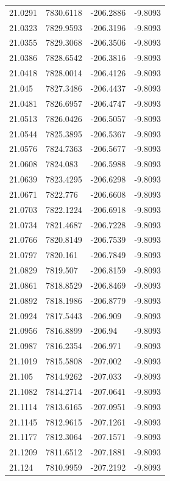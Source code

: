 \begin{table}[H]
\begin{tabular}{llll}
21.0291 & 7830.6118 & -206.2886 & -9.8093 \\
21.0323 & 7829.9593 & -206.3196 & -9.8093 \\
21.0355 & 7829.3068 & -206.3506 & -9.8093 \\
21.0386 & 7828.6542 & -206.3816 & -9.8093 \\
21.0418 & 7828.0014 & -206.4126 & -9.8093 \\
21.045 & 7827.3486 & -206.4437 & -9.8093 \\
21.0481 & 7826.6957 & -206.4747 & -9.8093 \\
21.0513 & 7826.0426 & -206.5057 & -9.8093 \\
21.0544 & 7825.3895 & -206.5367 & -9.8093 \\
21.0576 & 7824.7363 & -206.5677 & -9.8093 \\
21.0608 & 7824.083 & -206.5988 & -9.8093 \\
21.0639 & 7823.4295 & -206.6298 & -9.8093 \\
21.0671 & 7822.776 & -206.6608 & -9.8093 \\
21.0703 & 7822.1224 & -206.6918 & -9.8093 \\
21.0734 & 7821.4687 & -206.7228 & -9.8093 \\
21.0766 & 7820.8149 & -206.7539 & -9.8093 \\
21.0797 & 7820.161 & -206.7849 & -9.8093 \\
21.0829 & 7819.507 & -206.8159 & -9.8093 \\
21.0861 & 7818.8529 & -206.8469 & -9.8093 \\
21.0892 & 7818.1986 & -206.8779 & -9.8093 \\
21.0924 & 7817.5443 & -206.909 & -9.8093 \\
21.0956 & 7816.8899 & -206.94 & -9.8093 \\
21.0987 & 7816.2354 & -206.971 & -9.8093 \\
21.1019 & 7815.5808 & -207.002 & -9.8093 \\
21.105 & 7814.9262 & -207.033 & -9.8093 \\
21.1082 & 7814.2714 & -207.0641 & -9.8093 \\
21.1114 & 7813.6165 & -207.0951 & -9.8093 \\
21.1145 & 7812.9615 & -207.1261 & -9.8093 \\
21.1177 & 7812.3064 & -207.1571 & -9.8093 \\
21.1209 & 7811.6512 & -207.1881 & -9.8093 \\
21.124 & 7810.9959 & -207.2192 & -9.8093 \\

\end{tabular}
\end{table}
